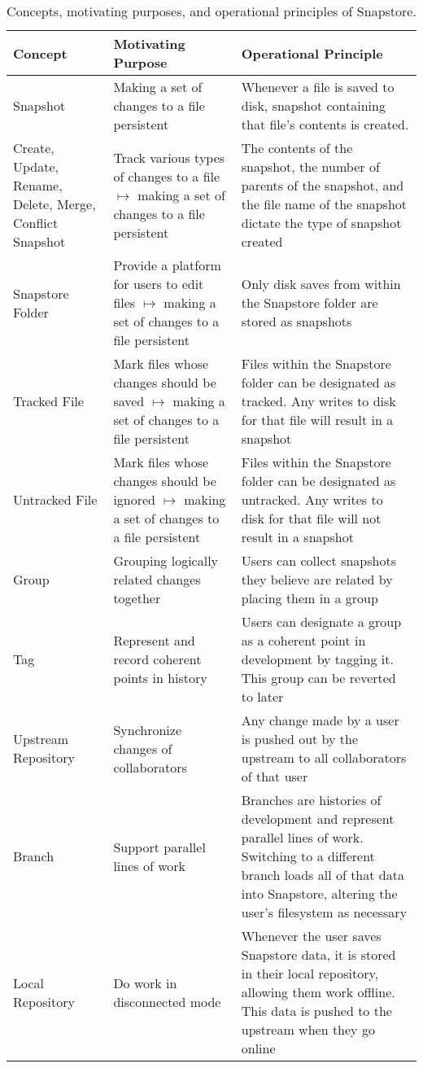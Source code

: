 \begin{table}
\begin{tabular}{ |p{3cm}||p{5cm}||p{8cm}|}
 \hline
 \textbf{Concept} & \textbf{Motivating Purpose} & \textbf{Operational Principle}\\[8pt]
 \hline
 Snapshot & Making a set of changes to a file persistent & Whenever a file is saved to disk, snapshot containing that file's contents is created.\\[8pt]
 Create, Update, Rename, Delete, Merge, Conflict Snapshot & Track various types of changes to a file $\mapsto$ making a set of changes to a file persistent & The contents of the snapshot, the number of parents of the snapshot, and the file name of the snapshot dictate the type of snapshot created\\[8pt]
 Snapstore Folder & Provide a platform for users to edit files $\mapsto$ making a set of changes to a file persistent & Only disk saves from within the Snapstore folder are stored as snapshots\\[8pt]
 Tracked File & Mark files whose changes should be saved $\mapsto$ making a set of changes to a file persistent & Files within the Snapstore folder can be designated as tracked. Any writes to disk for that file will result in a snapshot\\[8pt]
 Untracked File & Mark files whose changes should be ignored $\mapsto$ making a set of changes to a file persistent & Files within the Snapstore folder can be designated as untracked. Any writes to disk for that file will not result in a snapshot\\[8pt]
 \hline
 Group & Grouping logically related changes together & Users can collect snapshots they believe are related by placing them in a group\\[8pt]
 Tag & Represent and record coherent points in history & Users can designate a group as a coherent point in development by tagging it. This group can be reverted to later\\[8pt]
 \hline
 Upstream Repository & Synchronize changes of collaborators & Any change made by a user is pushed out by the upstream to all collaborators of that user\\[8pt]
 \hline
 Branch & Support parallel lines of work & Branches are histories of development and represent parallel lines of work. Switching to a different branch loads all of that data into Snapstore, altering the user's filesystem as necessary\\[8pt]
 \hline
 Local Repository & Do work in disconnected mode & Whenever the user saves Snapstore data, it is stored in their local repository, allowing them work offline. This data is pushed to the upstream when they go online\\[8pt]
 \hline
\end{tabular}
\caption{Concepts, motivating purposes, and operational principles of Snapstore.}
\end{table}

